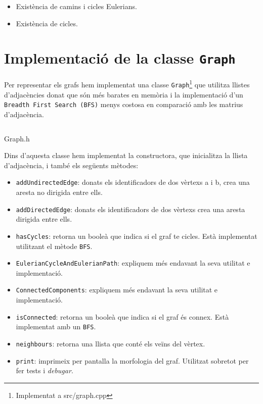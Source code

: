 \begin{itemize}
    \item Existència de camins i cicles Eulerians.
    \item Existència de cicles.
\end{itemize}





\section{Implementació de la classe \texttt{Graph}}
Per representar els grafs hem implementat una classe \texttt{Graph}\footnote{Implementat a src/graph.cpp} que utilitza llistes d'adjacències donat que són més barates en memòria i la implementació d'un \texttt{Breadth First Search (BFS)} menys costosa en comparació amb les matrius d'adjacència.

\begin{listing}
\inputminted{cpp}{src/graph.h}
\caption{Graph.h}
\end{listing}

Dins d'aquesta classe hem implementat la constructora, que inicialitza la llista d'adjacència, i també els següents mètodes:
\begin{itemize}
    \item\texttt{addUndirectedEdge}: donats els identificadors de dos vèrtexs a i b, crea una aresta no dirigida entre ells.
    \item\texttt{addDirectedEdge}: donats els identificadors de dos vèrtexs crea una aresta dirigida entre ells.
    \item\texttt{hasCycles}: retorna un booleà que indica si el graf te cicles. Està implementat utilitzant el mètode \texttt{BFS}.
    \item\texttt{EulerianCycleAndEulerianPath}: expliquem més endavant la seva utilitat e implementació.
    \item\texttt{ConnectedComponents}: expliquem més endavant la seva utilitat e implementació.
    \item\texttt{isConnected}: retorna un booleà que indica si el graf és connex. Està implementat amb un \texttt{BFS}.
    \item\texttt{neighbours}: retorna una llista que conté els veïns del vèrtex.
    \item\texttt{print}: imprimeix per pantalla la morfologia del graf. Utilitzat sobretot per fer tests i \textit{debugar}.
\end{itemize}

